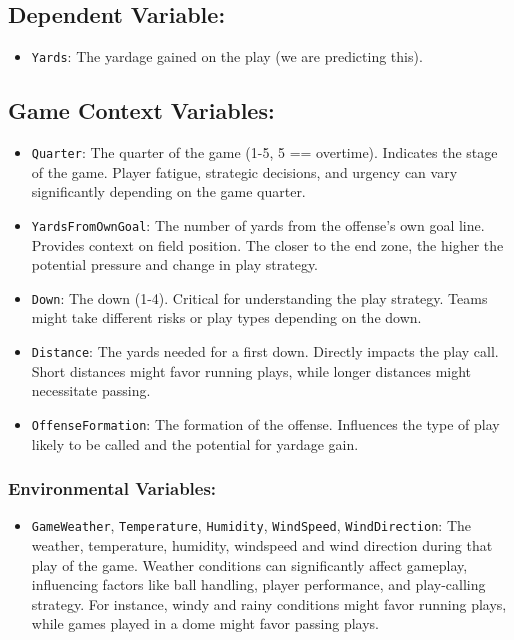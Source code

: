 \documentclass[
  super,
  preprint,
  3p]{elsarticle}
\providecommand{\tightlist}{%
  \setlength{\itemsep}{0pt}\setlength{\parskip}{0pt}}\usepackage{longtable,booktabs,array}
\begin{document}
\hypertarget{dependent-variable}{%
\subsection{Dependent Variable:}\label{dependent-variable}}

\begin{itemize}
\tightlist
\item
  \texttt{Yards}: The yardage gained on the play (we are predicting
  this).
\end{itemize}

\hypertarget{game-context-variables}{%
\subsection{Game Context Variables:}\label{game-context-variables}}

\begin{itemize}
\tightlist
\item
  \texttt{Quarter}: The quarter of the game (1-5, 5 == overtime).
  Indicates the stage of the game. Player fatigue, strategic decisions,
  and urgency can vary significantly depending on the game quarter.
\item
  \texttt{YardsFromOwnGoal}: The number of yards from the offense's own
  goal line. Provides context on field position. The closer to the end
  zone, the higher the potential pressure and change in play strategy.
\item
  \texttt{Down}: The down (1-4). Critical for understanding the play
  strategy. Teams might take different risks or play types depending on
  the down.
\item
  \texttt{Distance}: The yards needed for a first down. Directly impacts
  the play call. Short distances might favor running plays, while longer
  distances might necessitate passing.
\item
  \texttt{OffenseFormation}: The formation of the offense. Influences
  the type of play likely to be called and the potential for yardage
  gain.
\end{itemize}

\hypertarget{environmental-variables}{%
\subsubsection{Environmental Variables:}\label{environmental-variables}}

\begin{itemize}
\tightlist
\item
  \texttt{GameWeather}, \texttt{Temperature}, \texttt{Humidity},
  \texttt{WindSpeed}, \texttt{WindDirection}: The weather, temperature,
  humidity, windspeed and wind direction during that play of the game.
  Weather conditions can significantly affect gameplay, influencing
  factors like ball handling, player performance, and play-calling
  strategy. For instance, windy and rainy conditions might favor running
  plays, while games played in a dome might favor passing plays.
\end{itemize}
\end{document}
